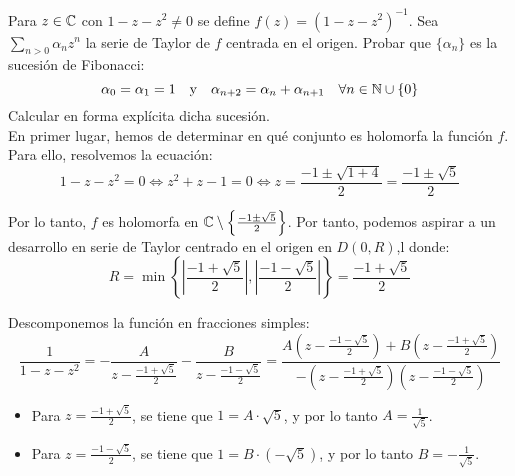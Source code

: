 \begin{ejercicio}
    Para $z \in \mathbb{C}$ con $1-z-z^2 \neq 0$ se define $f(z) = (1-z-z^2)^{-1}$. Sea $\sum\limits_{n>0} \alpha_n z^n$ la serie de Taylor de $f$ centrada en el origen. Probar que $\{\alpha_n\}$ es la sucesión de Fibonacci:
    \begin{equation*}
        \alpha_0 = \alpha_1 = 1 \quad \text{y} \quad \alpha_{n+2} = \alpha_n + \alpha_{n+1} \quad \forall n \in \mathbb{N}\cup\{0\}
    \end{equation*}
    Calcular en forma explícita dicha sucesión.\\

    En primer lugar, hemos de determinar en qué conjunto es holomorfa la función $f$. Para ello, resolvemos la ecuación:
    \begin{equation*}
        1-z-z^2 = 0\iff z^2+z-1=0\iff z=\frac{-1\pm\sqrt{1+4}}{2}=\frac{-1\pm\sqrt{5}}{2}
    \end{equation*}

    Por lo tanto, $f$ es holomorfa en $\mathbb{C}\setminus\left\{\frac{-1\pm\sqrt{5}}{2}\right\}$. Por tanto, podemos aspirar a un desarrollo en serie de Taylor centrado en el origen en $D\left(0,R\right)$,l donde:
    \begin{equation*}
        R=\min\left\{\left|\frac{-1+\sqrt{5}}{2}\right|,\left|\frac{-1-\sqrt{5}}{2}\right|\right\}
        =\frac{-1+\sqrt{5}}{2}
    \end{equation*}
    
    Descomponemos la función en fracciones simples:
    \begin{equation*}
        \frac{1}{1-z-z^2} = -\frac{A}{z-\frac{-1+\sqrt{5}}{2}} - \frac{B}{z-\frac{-1-\sqrt{5}}{2}}
        = \frac{A(z-\frac{-1-\sqrt{5}}{2})+B(z-\frac{-1+\sqrt{5}}{2})}{-(z-\frac{-1+\sqrt{5}}{2})(z-\frac{-1-\sqrt{5}}{2})}
    \end{equation*}

    \begin{itemize}
        \item Para $z=\frac{-1+\sqrt{5}}{2}$, se tiene que $1=A\cdot \sqrt{5}$, y por lo tanto $A=\frac{1}{\sqrt{5}}$.
        \item Para $z=\frac{-1-\sqrt{5}}{2}$, se tiene que $1=B\cdot (-\sqrt{5})$, y por lo tanto $B=-\frac{1}{\sqrt{5}}$.
    \end{itemize}


\end{ejercicio}
